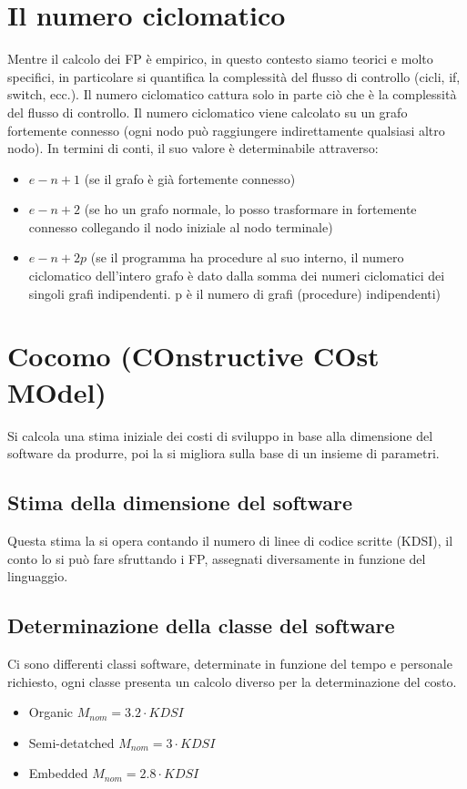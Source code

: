\documentclass[a4paper,12pt]{report}
\begin{document}
	\section{Il numero ciclomatico}
	Mentre il calcolo dei FP è empirico, in questo contesto siamo teorici e molto specifici, in particolare si quantifica la complessità del flusso di controllo (cicli, if, switch, ecc.). Il numero ciclomatico cattura solo in parte ciò che è la complessità del flusso di controllo.
	Il numero ciclomatico viene calcolato su un grafo fortemente connesso (ogni nodo può raggiungere indirettamente qualsiasi altro nodo). In termini di conti, il suo valore è determinabile attraverso:
	\begin{itemize}
		\item $e - n + 1$ (se il grafo è già fortemente connesso)
		\item $e - n + 2$ (se ho un grafo normale, lo posso trasformare in fortemente connesso collegando il nodo iniziale al nodo terminale)
		\item $e - n + 2p$ (se il programma ha procedure al suo interno, il numero ciclomatico dell'intero grafo è dato dalla somma dei numeri ciclomatici dei singoli grafi indipendenti. p è il numero di grafi (procedure) indipendenti)
	\end{itemize}
	\section{Cocomo (COnstructive COst MOdel)}
	Si calcola una stima iniziale dei costi di sviluppo in base alla dimensione del software da produrre, poi la si migliora sulla base di un insieme di parametri.
	\subsection{Stima della dimensione del software}
	Questa stima la si opera contando il numero di linee di codice scritte (KDSI), il conto lo si può fare sfruttando i FP, assegnati diversamente in funzione del linguaggio.
	\subsection{Determinazione della classe del software}
	Ci sono differenti classi software, determinate in funzione del tempo e personale richiesto, ogni classe presenta un calcolo diverso per la determinazione del costo.
	\begin{itemize}
		\item Organic $M_{nom} = 3.2 \cdot KDSI$
		\item Semi-detatched $M_{nom} = 3 \cdot KDSI$
		\item Embedded $M_{nom} = 2.8 \cdot KDSI$
	\end{itemize}
\end{document}
